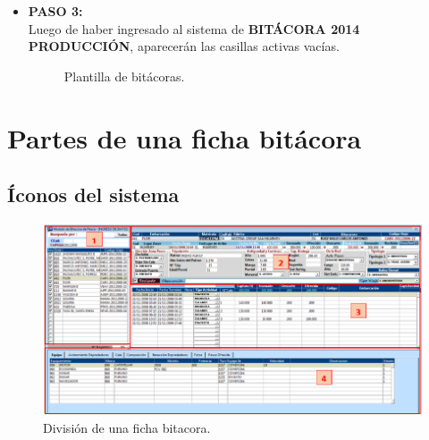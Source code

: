 \documentclass[a4paper,oneside,11pt]{book}
\begin{document}
\begin{itemize}
\item\textbf{PASO 3:}\\
Luego de haber ingresado al sistema de \textbf{BITÁCORA 2014 PRODUCCIÓN}, aparecerán las casillas activas vacías.
 \begin{figure}[!h]
  \begin{center} 
  \caption{Plantilla de bitácoras.}
 \end{center}
  \end{figure}

 \end{itemize}
  
\section {Partes de una ficha bitácora}
\subsection{Íconos del sistema}
  \begin{figure} [!h]
  	\begin{center}
  		\includegraphics[scale=0.6]{imagen_Manual_PBP/seccion.png}
  		\caption{División de una ficha bitacora.}
  	\end{center}
  \end{figure}
\end{document}
